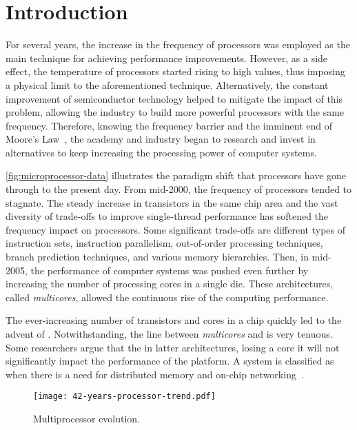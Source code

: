 \chapter{Introduction}
\label{ch.intro}

	For several years, the increase in the frequency of processors was
	employed as the main technique for achieving performance
	improvements. However, as a side effect, the temperature of
	processors started rising to high values, thus imposing a physical
	limit to the aforementioned technique. Alternatively, the constant
	improvement of semiconductor technology helped to mitigate the
	impact of this problem, allowing the industry to build more powerful
	processors with the same frequency. Therefore, knowing the
	frequency barrier and the imminent end of Moore's
	Law~\cite{moore:1965}, the academy and industry began to research
	and invest in alternatives to keep increasing the processing power
	of computer systems.

	\autoref{fig:microprocessor-data} illustrates the paradigm shift
	that processors have gone through to the present day. From mid-2000,
	the frequency of processors tended to stagnate. The steady increase
	in transistors in the same chip area and the vast diversity of
	trade-offs to improve single-thread performance has softened the
	frequency impact on processors. Some significant trade-offs are
	different types of instruction sets, instruction parallelism,
	out-of-order processing techniques, branch prediction techniques,
	and various memory hierarchies. Then, in mid-2005, the performance
	of computer systems was pushed even further by increasing the number
	of processing cores in a single die. These architectures, called
	\textit{multicores}, allowed the continuous rise of the computing
	performance.

	The ever-increasing number of transistors and cores in a chip
	quickly led to the advent of \manycores. Notwithstanding, the line
	between \textit{multicores} and \manycores is very tenuous. Some
	researchers argue that the in latter architectures, losing a core it
	will not significantly impact the performance of the platform. A
	system is classified as \manycore when there is a need for
	distributed memory and on-chip networking~\cite{freitas:thesis}.

	\begin{figure}[t]
		\centering%
		\caption{Multiprocessor evolution.}%
		\label{fig:microprocessor-data}%
		\texttt{[image: 42-years-processor-trend.pdf]}%
	\end{figure}

